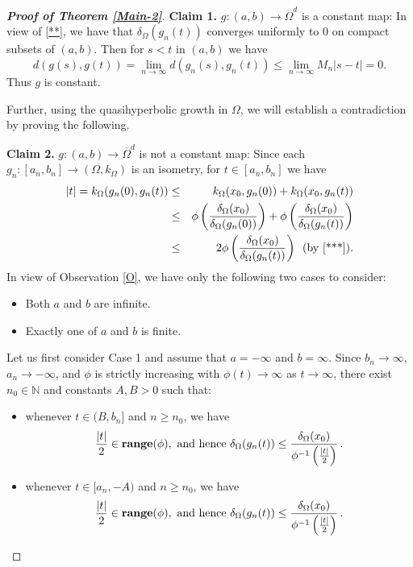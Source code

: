 \documentclass[a4paper,12pt]{amsart}
\theoremstyle{definition}
\begin{document}
\begin{proof}[\textbf{Proof of Theorem \ref{Main-2}}]
	\noindent\textbf{Claim 1.} $g:(a,b) \rightarrow \overline{\Omega}^{d}$ is a constant map: In view of \eqref{**}, we have that $\delta_{\Omega}(g_n(t))$ converges uniformly to $0$ on compact subsets of $(a,b)$. Then for $s<t$ in $(a,b)$ we have
	\begin{equation}
		d(g(s),g(t)) = \lim_{n \rightarrow \infty} d(g_{n}(s),g_{n}(t))\le \lim\limits_{n\to \infty}M_n|s-t|=0.
	\end{equation}
	Thus $g$ is constant. 
	
	Further, using the quasihyperbolic growth in $\Omega$, we will establish a contradiction by proving the following.
	
	\noindent\textbf{Claim 2.} $g :(a,b) \rightarrow \overline{\Omega}^{d}$ is not a constant map: Since each $g_n:[a_n,b_n]\to(\Omega,k_\Omega)$ is an isometry, for $t\in[a_n,b_n]$ we have
	\begin{eqnarray*}
		|t|=k_{\Omega} (g_{n}(0),g_{n}(t)) &\leq& k_{\Omega} (x_{0},g_{n}(0)) + k_{\Omega} (x_{0},g_{n}(t))\\
		&\leq& \phi\left(\frac{\delta_{\Omega}(x_0)}{\delta_{\Omega}(g_n(0))}\right)+\phi\left(\frac{\delta_{\Omega}(x_0)}{\delta_{\Omega}(g_n(t))}\right)\\
		&\leq& 2\phi\left(\frac{\delta_{\Omega}(x_0)}{\delta_{\Omega}(g_n(t))}\right)\,\,\, (\mbox{by }\eqref{***}).
	\end{eqnarray*}
	In view of Observation \ref{O}, we have only the following two cases to consider:
	\begin{itemize}
		\item[Case 1:] Both $a$ and $b$ are infinite.
		\item[Case 2:] Exactly one of $a$ and $b$ is finite.
	\end{itemize}
	
	Let us first consider Case 1 and assume that $a=-\infty$ and $b=\infty$. Since $b_n\to \infty$, $a_n\to -\infty$, and $\phi$ is strictly increasing with $\phi(t)\to\infty$ as $t\to\infty$, there exist $n_0\in\mathbb{N}$ and constants $A,B>0$ such that:
	\begin{itemize}
		\item[(i)] whenever $t\in (B,b_n]$ and $n\ge n_0$, we have
		$$\frac{|t|}{2}\in \mbox{\textbf{range}}(\phi), \ \text{and hence}\  \delta_{\Omega}(g_n(t))\le \frac{\delta_{\Omega}(x_0)}{\phi^{-1}\left(\frac{|t|}{2}\right)}\,.$$
		\item[(ii)] whenever $t\in [a_n,-A)$ and $n\ge n_0$, we have
		$$\frac{|t|}{2}\in \mbox{\textbf{range}}(\phi), \ \text{and hence}\  \delta_{\Omega}(g_n(t))\le \frac{\delta_{\Omega}(x_0)}{\phi^{-1}\left(\frac{|t|}{2}\right)}\,.$$
	\end{itemize}
	

\end{proof}
\end{document}
